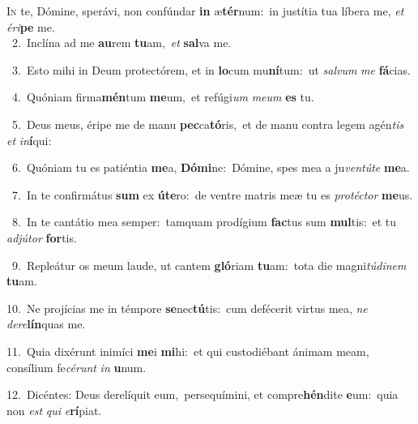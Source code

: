 \lettrine{\initial\textcolor{\initialcolor}{I}}{n} te, Dómine, sperávi, non confúndar \textbf{in} æ\-\textbf{tér}\-num:~\star in justítia tua líbera me, \textit{et} \textit{é}\-\textit{ri}\textbf{pe} me.\\
{\numbfont\textcolor{\numbcolor}{~2.}}~Inclína ad me \textbf{au}\-rem \textbf{tu}\-am,~\star \textit{et} \textbf{sal}\-va me.\par
{\numbfont\textcolor{\numbcolor}{~3.}}~Esto mihi in Deum protectórem, et in \textbf{lo}\-cum mu\-\textbf{ní}\-tum:~\star ut \textit{sal}\-\textit{vum} \textit{me} \textbf{fá}\-cias.\par
{\numbfont\textcolor{\numbcolor}{~4.}}~Quóniam firma\-\textbf{mén}\-tum \textbf{me}\-um,~\star et refúgi\textit{um} \textit{me}\-\textit{um} \textbf{es} tu.\par
{\numbfont\textcolor{\numbcolor}{~5.}}~Deus meus, éripe me de manu \textbf{pec}\-ca\-\textbf{tó}\-ris,~\star et de manu contra legem agén\textit{tis} \textit{et} \textit{in}\-\textbf{í}qui:\par
{\numbfont\textcolor{\numbcolor}{~6.}}~Quóniam tu es patiéntia \textbf{me}\-a, \textbf{Dó}\-\textbf{mi}ne:~\star Dómine, spes mea a ju\-\textit{ven}\-\textit{tú}\textit{te} \textbf{me}\-a.\par
{\numbfont\textcolor{\numbcolor}{~7.}}~In te confirmátus \textbf{sum} ex \textbf{ú}\-\textbf{te}ro:~\star de ventre matris meæ tu es \textit{pro}\-\textit{téc}\textit{tor} \textbf{me}\-us.\par
{\numbfont\textcolor{\numbcolor}{~8.}}~In te cantátio mea semper:~\dagger tamquam prodígium \textbf{fac}\-tus sum \textbf{mul}\-tis:~\star et tu \textit{ad}\-\textit{jú}\textit{tor} \textbf{for}\-tis.\par
{\numbfont\textcolor{\numbcolor}{~9.}}~Repleátur os meum laude, ut cantem \textbf{gló}\-riam \textbf{tu}\-am:~\star tota die magni\-\textit{tú}\-\textit{di}\textit{nem} \textbf{tu}\-am.\par
{\numbfont\textcolor{\numbcolor}{10.}}~Ne projícias me in témpore \textbf{se}\-nec\-\textbf{tú}\-tis:~\star cum defécerit virtus mea, \textit{ne} \textit{de}\-\textit{re}\textbf{lín}quas me.\par
{\numbfont\textcolor{\numbcolor}{11.}}~Quia dixérunt inimíci \textbf{me}\-i \textbf{mi}\-hi:~\star et qui custodiébant ánimam meam, consílium fe\-\textit{cé}\-\textit{runt} \textit{in} \textbf{u}\-num.\par
{\numbfont\textcolor{\numbcolor}{12.}}~Dicéntes: Deus derelíquit eum,~\dagger persequímini, et compre\-\textbf{hén}\-dite \textbf{e}\-um:~\star quia non \textit{est} \textit{qui} \textit{e}\-\textbf{rí}piat.\par
